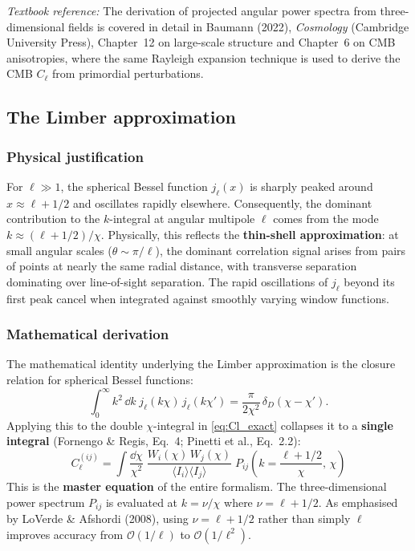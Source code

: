 \documentclass[10pt,a4paper]{article}
\newcommand{\Cl}{C_\ell}
\begin{document}
\textit{Textbook reference:} The derivation of projected angular power spectra from three-dimensional fields is covered in detail in Baumann (2022), \textit{Cosmology} (Cambridge University Press), Chapter~12 on large-scale structure and Chapter~6 on CMB anisotropies, where the same Rayleigh expansion technique is used to derive the CMB $\Cl$ from primordial perturbations.

\subsection{The Limber approximation}
\label{sec:limber}

\subsubsection{Physical justification}

For $\ell \gg 1$, the spherical Bessel function $j_\ell(x)$ is sharply peaked around $x \approx \ell + 1/2$ and oscillates rapidly elsewhere. Consequently, the dominant contribution to the $k$-integral at angular multipole $\ell$ comes from the mode $k \approx (\ell + 1/2)/\chi$. Physically, this reflects the \textbf{thin-shell approximation}: at small angular scales ($\theta \sim \pi/\ell$), the dominant correlation signal arises from pairs of points at nearly the same radial distance, with transverse separation dominating over line-of-sight separation. The rapid oscillations of $j_\ell$ beyond its first peak cancel when integrated against smoothly varying window functions.

\subsubsection{Mathematical derivation}

The mathematical identity underlying the Limber approximation is the closure relation for spherical Bessel functions:
\begin{equation}
\label{eq:bessel_closure}
\int_0^\infty k^2 \, \dd k \; j_\ell(k\chi) \, j_\ell(k\chi') = \frac{\pi}{2\chi^2} \, \delta_D(\chi - \chi').
\end{equation}
Applying this to the double $\chi$-integral in \cref{eq:Cl_exact} collapses it to a \textbf{single integral} (Fornengo \& Regis, Eq.~4; Pinetti et al., Eq.~2.2):
\begin{equation}
\label{eq:Cl_limber}
\boxed{
\Cl^{(ij)} = \int \frac{\dd\chi}{\chi^2} \; \frac{W_i(\chi) \, W_j(\chi)}{\langle I_i \rangle \langle I_j \rangle} \; P_{ij}\!\left(k = \frac{\ell + 1/2}{\chi}, \, \chi\right)
}
\end{equation}
This is the \textbf{master equation} of the entire formalism. The three-dimensional power spectrum $P_{ij}$ is evaluated at $k = \nu/\chi$ where $\nu = \ell + 1/2$. As emphasised by LoVerde \& Afshordi (2008), using $\nu = \ell + 1/2$ rather than simply $\ell$ improves accuracy from $\mathcal{O}(1/\ell)$ to $\mathcal{O}(1/\ell^2)$.
\end{document}
